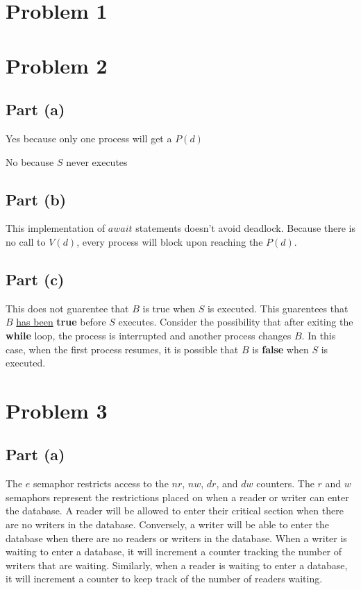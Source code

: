 \documentclass{article}%
\begin{document}
\section*{Problem 1}


\section*{Problem 2}

\subsection*{Part (a)}
Yes because only one process will get a $P(d)$

No because $S$ never executes

\subsection*{Part (b)}
This implementation of $await$ statements doesn't avoid deadlock. Because there is no
call to $V(d)$, every process will block upon reaching the $P(d)$.

\subsection*{Part (c)}
This does not guarentee that $B$ is true when $S$ is executed. This guarentees that $B$ \underline{has been}
\textbf{true} before $S$ executes. Consider the possibility that after exiting the \textbf{while} loop, the
process is interrupted and another process changes $B$. In this case, when the first process resumes, it is
possible that $B$ is \textbf{false} when $S$ is executed.

\section*{Problem 3}

\subsection*{Part (a)}
The $e$ semaphor restricts access to the $nr$, $nw$, $dr$, and $dw$ counters. The $r$ and $w$ semaphors represent
the restrictions placed on when a reader or writer can enter the database. A reader will be allowed to enter their
critical section when there are no writers in the database. Conversely, a writer will be able to enter the database
when there are no readers or writers in the database. When a writer is waiting to enter a database, it will increment
a counter tracking the number of writers that are waiting. Similarly, when a reader is waiting to enter a database, it
will increment a counter to keep track of the number of readers waiting.
\end{document}

